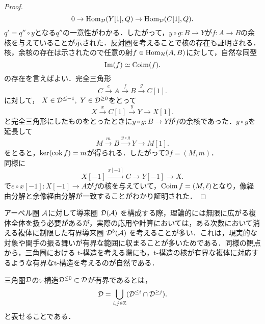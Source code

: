\begin{proof}
	\[0\rightarrow \operatorname{\mathrm{Hom}}_{{\mathcal D}}(Y[1],Q) \rightarrow \operatorname{\mathrm{Hom}}_{{\mathcal D}}(C[1],Q).\]
	$q'=q''\circ y$となる$q''$の一意性がわかる．したがって，$y\circ g\colon B\to Y$が$f\colon A\to B$の余核を与えていることが示された．反対圏を考えることで核の存在も証明される．\\
	核，余核の存在は示されたので任意の射$f\in\operatorname{\mathrm{Hom}}_{{\mathcal H}}(A,B)$に対して，自然な同型
\[\Im(f)\simeq \operatorname{\mathrm{Coim}}(f).\]
の存在を言えばよい．完全三角形
	\[C\xrightarrow{e}A\xrightarrow{f}B\xrightarrow{g}C[1].\]
	に対して， $X\in{\mathcal D}^{\le -1},\ Y\in{\mathcal D}^{\ge 0}$をとって
	\[X\xrightarrow{x}C[1]\xrightarrow{y}Y\rightarrow X[1].\]
	と完全三角形にしたものをとったときに$y\circ g\colon B\to Y$が$f$の余核であった．$y\circ g$を延長して
	\[M\xrightarrow{m}B\xrightarrow{y\circ g}Y\rightarrow M[1].\]
をとると，$\ker(\operatorname{cok} f) = m$が得られる．したがって$\Im f= (M,m)$．\\
同様に
\[X[-1]\xrightarrow{x[-1]} C \rightarrow Y[-1]\rightarrow X.\]
で$e\circ x[-1]\colon X[-1]\to A$が$f$の核を与えていて，$\operatorname{\mathrm{Coim}} f = (M,\ell)$となり，像経由分解と余像経由分解が一致することがわかり証明された．
\end{proof}

アーベル圏 ${\mathcal A}$に対して導来圏 ${\mathcal D}({\mathcal A})$ を構成する際，理論的には無限に広がる複体全体を扱う必要があるが，実際の応用や計算においては，ある次数において消える複体に制限した有界導来圏 ${\mathcal D}^b({\mathcal A})$ を考えることが多い．これは，現実的な対象や関手の振る舞いが有界な範囲に収まることが多いためである．同様の観点から，三角圏における t-構造を考える際にも，t-構造の核が有界な複体に対応するような有界なt-構造を考えるのが自然である．
\begin{defn}\cite{BBD}
	三角圏${\mathcal D}$のt-構造${\mathcal D}^{\le 0}\subset {\mathcal D}$が有界であるとは，
	\[{\mathcal D} = \bigcup_{i,j\in{\mathbb Z}}({\mathcal D}^{\le i}\cap{\mathcal D}^{\ge j}).\]
	と表せることである．
\end{defn}

